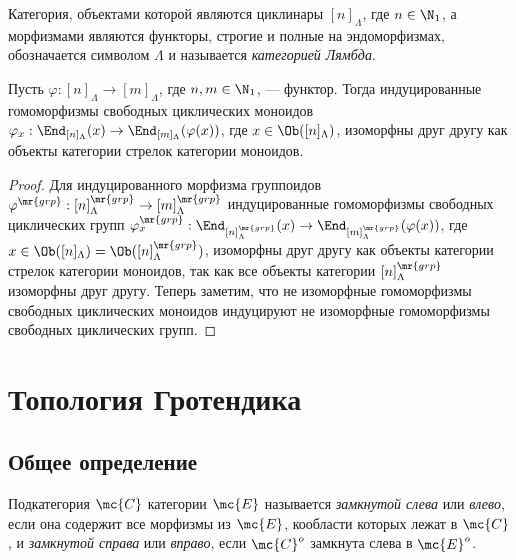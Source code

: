 \documentclass[
	extrafontsizes,
	11pt,
	hyphens,
]{memoir}
\begin{document}
\begin{definition}
Категория, объектами которой являются циклинары \([n]_\Lambda\), где \(n \in \N_1\), а морфизмами
являются функторы,
строгие и полные на эндоморфизмах,
обозначается символом \(\Lambda\) и называется \emph{категорией Лямбда}.
\end{definition}

\begin{lemma}%
Пусть \(\varphi : [n]_\Lambda \to [m]_\Lambda\), где \(n, m \in \N_1\), --- функтор.
Тогда индуцированные гомоморфизмы свободных циклических моноидов
\(\varphi_x : \End_{[n]_\Lambda}(x) \to \End_{[m]_\Lambda}(\varphi(x))\),
где \(x \in \Ob([n]_\Lambda)\),
изоморфны друг другу
как объекты категории стрелок категории моноидов.
\end{lemma}

\begin{proof}
Для индуцированного морфизма группоидов
\(\varphi^\mr{grp} : [n]_\Lambda^\mr{grp} \to [m]_\Lambda^\mr{grp}\)
индуцированные гомоморфизмы свободных циклических групп
\(\varphi_x^\mr{grp} : \End_{[n]_\Lambda^\mr{grp}}(x) \to \End_{[m]_\Lambda^\mr{grp}}(\varphi(x))\),
где \(x \in \Ob([n]_\Lambda) = \Ob([n]_\Lambda^\mr{grp})\),
изоморфны друг другу как объекты категории стрелок категории моноидов, так как все объекты категории \([n]_\Lambda^\mr{grp}\) изоморфны друг другу.
Теперь заметим, что не изоморфные гомоморфизмы свободных циклических моноидов индуцируют не изоморфные гомоморфизмы свободных циклических групп.
\end{proof}


\section{Топология Гротендика}

\subsection{Общее определение}

\begin{definition}
Подкатегория \(\mc{C}\) категории \(\mc{E}\) называется \emph{замкнутой слева} или \emph{влево}, если она содержит все морфизмы из \(\mc{E}\), кообласти которых лежат в \(\mc{C}\),
и \emph{замкнутой справа} или \emph{вправо}, если \(\mc{C}^o\) замкнута слева в \(\mc{E}^o\).
\end{definition}
\end{document}
